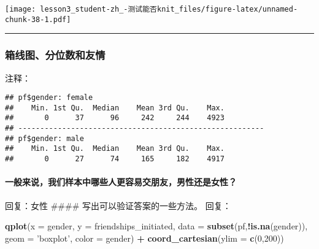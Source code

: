 \documentclass[]{article}
\newenvironment{Shaded}{\begin{snugshade}}{\end{snugshade}}
\newcommand{\DataTypeTok}[1]{\textcolor[rgb]{0.13,0.29,0.53}{#1}}
\newcommand{\DecValTok}[1]{\textcolor[rgb]{0.00,0.00,0.81}{#1}}
\newcommand{\KeywordTok}[1]{\textcolor[rgb]{0.13,0.29,0.53}{\textbf{#1}}}
\newcommand{\NormalTok}[1]{#1}
\newcommand{\OperatorTok}[1]{\textcolor[rgb]{0.81,0.36,0.00}{\textbf{#1}}}
\newcommand{\StringTok}[1]{\textcolor[rgb]{0.31,0.60,0.02}{#1}}
\let\oldparagraph\paragraph
\renewcommand{\paragraph}[1]{\oldparagraph{#1}\mbox{}}
\begin{document}
\texttt{[image: lesson3\_student-zh\_-测试能否knit\_files/figure-latex/unnamed-chunk-38-1.pdf]}

\begin{center}\rule{0.5\linewidth}{\linethickness}\end{center}

\subsubsection{箱线图、分位数和友情}

注释：

\begin{Shaded}
\end{Shaded}

\begin{verbatim}
## pf$gender: female
##    Min. 1st Qu.  Median    Mean 3rd Qu.    Max. 
##       0      37      96     242     244    4923 
## -------------------------------------------------------- 
## pf$gender: male
##    Min. 1st Qu.  Median    Mean 3rd Qu.    Max. 
##       0      27      74     165     182    4917
\end{verbatim}

\paragraph{一般来说，我们样本中哪些人更容易交朋友，男性还是女性？}

回复：女性 \#\#\#\# 写出可以验证答案的一些方法。 回复：

\begin{Shaded}
\begin{Highlighting}[]
\KeywordTok{qplot}\NormalTok{(}\DataTypeTok{x =}\NormalTok{ gender, }\DataTypeTok{y =}\NormalTok{ friendships_initiated,}
      \DataTypeTok{data =} \KeywordTok{subset}\NormalTok{(pf,}\OperatorTok{!}\KeywordTok{is.na}\NormalTok{(gender)), }
      \DataTypeTok{geom =} \StringTok{'boxplot'}\NormalTok{, }\DataTypeTok{color =}\NormalTok{ gender) }\OperatorTok{+}
\StringTok{  }\KeywordTok{coord_cartesian}\NormalTok{(}\DataTypeTok{ylim =} \KeywordTok{c}\NormalTok{(}\DecValTok{0}\NormalTok{,}\DecValTok{200}\NormalTok{))}
\end{Highlighting}
\end{Shaded}
\end{document}
